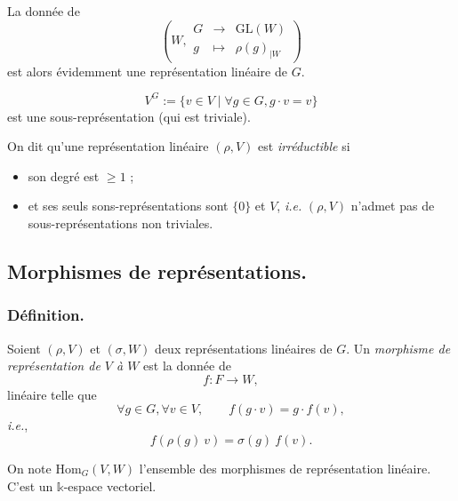 \documentclass{../../notes}
\begin{document}
  \begin{obs}
    La donnée de \[
      \left(
        W,
        \begin{array}{rcl}
          G & \to& \mathrm{GL}(W)\\
          g &\mapsto & \rho(g)_{|W}
        \end{array}
      \right)
    \] est alors évidemment une représentation linéaire de $G$.
  \end{obs}

  \begin{exm}
    \[
    V^G := \{v \in V  \mid \forall g \in G, g \cdot v = v \} 
    \] est une sous-représentation (qui est triviale).
  \end{exm}

  \begin{defn}
    On dit qu'une représentation linéaire $(\rho, V)$ est  \textit{irréductible} si 
    \begin{itemize}
      \item son degré est $\ge 1$ ;
      \item et ses seuls sons-représentations sont $\{0\}$ et $V$, \textit{i.e.} $(\rho,V)$ n'admet pas de sous-représentations non triviales.
    \end{itemize}
  \end{defn}

  \subsection{Morphismes de représentations.}

  \subsubsection{Définition.}

  \begin{defn}
    Soient $(\rho, V)$ et  $(\sigma, W)$ deux représentations linéaires de $G$.
    Un \textit{morphisme de  représentation de $V$ à $W$} est la donnée de \[
    f : F \to W
    ,\] 
    linéaire telle que \[
    \forall g \in G, \forall v \in V, \quad\quad f(g \cdot v) = g \cdot f(v)
    ,\] 
    \textit{i.e.},
    \[
    f(\rho(g)\: v) = \sigma(g)\:  f(v)
    .\]
  \end{defn}

  \begin{nota}
    On note $\mathrm{Hom}_G(V,W)$ l'ensemble des morphismes de représentation linéaire.
    C'est un $\mathds{k}$-espace vectoriel.
  \end{nota}
\end{document}
